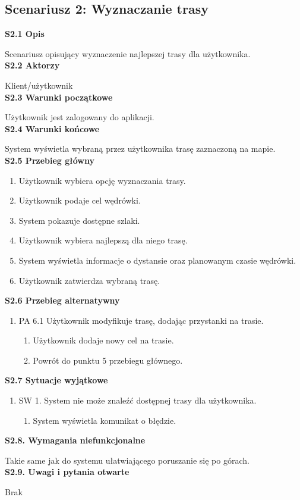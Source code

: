     \subsection*{Scenariusz 2: Wyznaczanie trasy}
    \textbf{S2.1 Opis} \par
    Scenariusz opisujący wyznaczenie najlepszej trasy dla użytkownika. \\
    \textbf{S2.2 Aktorzy} \par
    Klient/użytkownik \\
    \textbf{S2.3 Warunki początkowe} \par
    Użytkownik jest zalogowany do aplikacji. \\
    \textbf{S2.4 Warunki końcowe} \par
    System wyświetla wybraną przez użytkownika trasę zaznaczoną na mapie. \\
    \textbf{S2.5 Przebieg główny}
    \begin{enumerate}
        \item Użytkownik wybiera opcję wyznaczania trasy.
        \item Użytkownik podaje cel wędrówki.
        \item System pokazuje dostępne szlaki.
        \item Użytkownik wybiera najlepszą dla niego trasę.
        \item System wyświetla informacje o dystansie oraz planowanym czasie wędrówki.
        \item Użytkownik zatwierdza wybraną trasę.
    \end{enumerate}
    \textbf{S2.6 Przebieg alternatywny}
    \begin{enumerate}
        \item[] PA 6.1 Użytkownik modyfikuje trasę, dodając przystanki na trasie.
        \begin{enumerate}
            \item Użytkownik dodaje nowy cel na trasie.
            \item Powrót do punktu 5 przebiegu głównego.
        \end{enumerate}
    \end{enumerate}
    \textbf{S2.7 Sytuacje wyjątkowe} \par
    \begin{enumerate}
        \item []SW 1. System nie może znaleźć dostępnej trasy dla użytkownika.
        \begin{enumerate}
            \item System wyświetla komunikat o błędzie.
        \end{enumerate}
    \end{enumerate}
    \textbf{S2.8. Wymagania niefunkcjonalne} \par
    Takie same jak do systemu ułatwiającego poruszanie się po górach. \\
    \textbf{S2.9. Uwagi i pytania otwarte} \par
    Brak 


